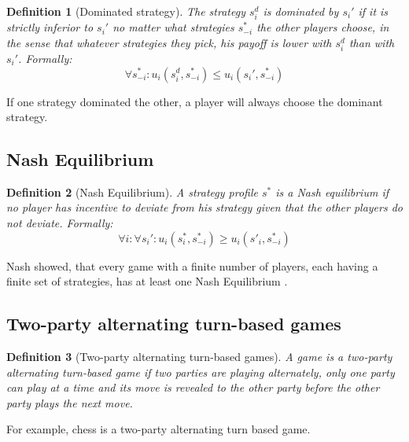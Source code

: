 \documentclass{cacthesis}
\newtheorem{definition}{Definition}
\begin{document}
\begin{definition}[Dominated strategy]
The strategy $s^d_i$ is dominated by $s_i'$ if it is strictly inferior to $s_i'$ no matter what strategies $s^*_{-i}$ the other players choose, in the sense that whatever strategies they pick, his payoff is lower with $s^d_i$ than with $s_i'${\normalfont \cite{rasmusen_games_nodate}}. Formally: 
\begin{equation}
    \forall s^*_{-i}: u_i(s^d_i,s^*_{-i}) \leq u_i(s_i',s^*_{-i})
\end{equation}
\end{definition}

If one strategy dominated the other, a player will always choose the dominant strategy.
\subsection{Nash Equilibrium}
\begin{definition}[Nash Equilibrium]
A strategy profile $s^*$ is a Nash equilibrium if no player has incentive to deviate from his strategy given that the other players do not deviate. {\normalfont \cite{rasmusen_games_nodate}} Formally: \begin{equation}
    \forall i: \forall s_i': u_i(s^*_i,s^*_{-i}) \geq u_i(s'_i,s^*_{-i})
\end{equation}
\end{definition}
Nash showed, that every game with a finite number of players, each having a finite set of strategies, has at least one Nash Equilibrium \cite{nash1950}.

\subsection{Two-party alternating turn-based games}
\label{sec:turnbasedgames}
\begin{definition}[Two-party alternating turn-based games]
\label{def:turn-based-game}
A game is a two-party alternating turn-based game if two parties are playing alternately, only one party can play at a time and its move is revealed
to the other party before the other party plays the next move.
\end{definition}
For example, chess is a two-party alternating turn based game.\newline
\end{document}
